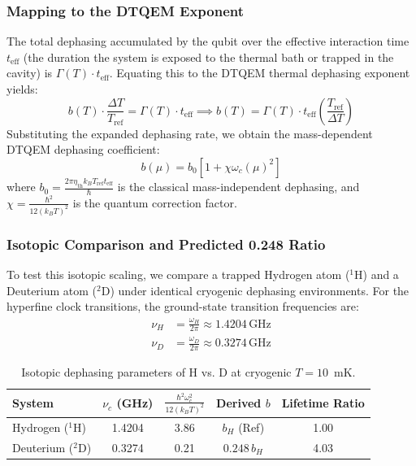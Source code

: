 \documentclass[reprint,amsmath,amssymb,aps,pra,superscriptaddress]{revtex4-2}
\begin{document}
\subsubsection{Mapping to the DTQEM Exponent}
The total dephasing accumulated by the qubit over the effective interaction time $t_{\text{eff}}$ (the duration the system is exposed to the thermal bath or trapped in the cavity) is $\Gamma(T) \cdot t_{\text{eff}}$. Equating this to the DTQEM thermal dephasing exponent yields:
\begin{equation}
    b(T) \cdot \frac{\Delta T}{T_{\text{ref}}} = \Gamma(T) \cdot t_{\text{eff}} \implies b(T) = \Gamma(T) \cdot t_{\text{eff}} \left( \frac{T_{\text{ref}}}{\Delta T} \right)
\end{equation}
Substituting the expanded dephasing rate, we obtain the mass-dependent DTQEM dephasing coefficient:
\begin{equation}
    b(\mu) = b_0 \left[ 1 + \chi \omega_c(\mu)^2 \right]
    \label{eq:b_quantum_scaling}
\end{equation}
where $b_0 = \frac{2 \pi \eta_{\text{th}} k_B T_{\text{ref}} t_{\text{eff}}}{\hbar}$ is the classical mass-independent dephasing, and $\chi = \frac{\hbar^2}{12 (k_B T)^2}$ is the quantum correction factor.

\subsubsection{Isotopic Comparison and Predicted 0.248 Ratio}
To test this isotopic scaling, we compare a trapped Hydrogen atom ($^1$H) and a Deuterium atom ($^2$D) under identical cryogenic dephasing environments. For the hyperfine clock transitions, the ground-state transition frequencies are:
\begin{align}
    \nu_H &= \frac{\omega_H}{2\pi} \approx 1.4204\,\text{GHz} \\
    \nu_D &= \frac{\omega_D}{2\pi} \approx 0.3274\,\text{GHz}
\end{align}

\begin{table}[h]
\caption{Isotopic dephasing parameters of H vs. D at cryogenic $T = 10$~mK.}
\label{tab:isotopic}
\begin{ruledtabular}
\begin{tabular}{lcccc}
System & $\nu_c$ (GHz) & $\frac{\hbar^2 \omega_c^2}{12 (k_B T)^2}$ & Derived $b$ & Lifetime Ratio \\ \hline
Hydrogen ($^1$H) & 1.4204 & 3.86 & $b_H$ (Ref) & 1.00 \\
Deuterium ($^2$D) & 0.3274 & 0.21 & $0.248\,b_H$ & 4.03 \\
\end{tabular}
\end{ruledtabular}
\end{table}
\end{document}
